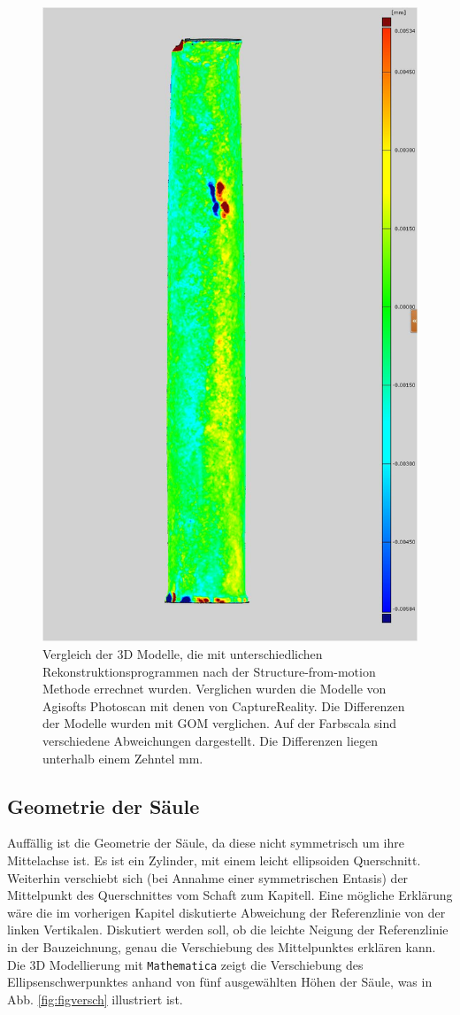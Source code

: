\documentclass[twocolumn]{bmcart}
\begin{document}
\begin{figure}[h]
\centering
\includegraphics[width=0.7\linewidth]{figures/saeulenvergleich}
\caption{Vergleich der 3D Modelle, die mit unterschiedlichen Rekonstruktionsprogrammen nach der Structure-from-motion Methode errechnet wurden. Verglichen wurden die Modelle von Agisofts Photoscan mit denen von CaptureReality. Die Differenzen der Modelle wurden mit GOM verglichen. Auf der Farbscala sind verschiedene Abweichungen dargestellt. Die Differenzen liegen unterhalb einem Zehntel mm.}
\label{fig:saeulenvergleich}
\end{figure}


\subsection{Geometrie der Säule}

Auffällig ist die Geometrie der Säule, da diese nicht symmetrisch um ihre Mittelachse ist. Es ist ein Zylinder, mit einem leicht ellipsoiden Querschnitt. 
Weiterhin verschiebt sich (bei Annahme einer symmetrischen Entasis) der Mittelpunkt des Querschnittes vom Schaft zum Kapitell. Eine mögliche Erklärung wäre die im vorherigen Kapitel diskutierte Abweichung der Referenzlinie von der linken Vertikalen. Diskutiert werden soll, ob die leichte Neigung der Referenzlinie in der Bauzeichnung, genau die Verschiebung des Mittelpunktes erklären kann. Die 3D Modellierung mit  \texttt{Mathematica} zeigt die Verschiebung des Ellipsenschwerpunktes anhand von fünf ausgewählten Höhen der Säule, was in Abb. \ref{fig:figversch} illustriert ist. 
\end{document}

